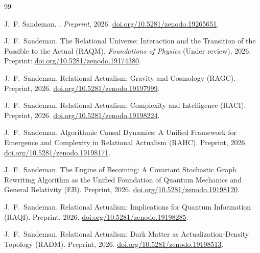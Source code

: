 \documentclass[11pt,a4paper]{article}
\theoremstyle{plain}
\theoremstyle{definition}
\theoremstyle{remark}
\begin{document}

\begin{thebibliography}{99}

J.~F. Sandeman.
.
\newblock \textit{Preprint}, 2026.
\newblock \href{https://doi.org/10.5281/zenodo.19265651}{doi.org/10.5281/zenodo.19265651}.


J.~F.~Sandeman.
\newblock The Relational Universe: Interaction and the Transition of the
  Possible to the Actual ({RAQM}).
\newblock \textit{Foundations of Physics} (Under review), 2026.
\newblock Preprint: \href{https://doi.org/10.5281/zenodo.19174380}{doi.org/10.5281/zenodo.19174380}.

J.~F.~Sandeman.
\newblock Relational Actualism: Gravity and Cosmology ({RAGC}).
\newblock Preprint, 2026.
\newblock \href{https://doi.org/10.5281/zenodo.19197999}{doi.org/10.5281/zenodo.19197999}.

J.~F.~Sandeman.
\newblock Relational Actualism: Complexity and Intelligence ({RACI}).
\newblock Preprint, 2026.
\newblock \href{https://doi.org/10.5281/zenodo.19198224}{doi.org/10.5281/zenodo.19198224}.

J.~F.~Sandeman.
\newblock Algorithmic Causal Dynamics: A Unified Framework for Emergence and
  Complexity in Relational Actualism ({RAHC}).
\newblock Preprint, 2026.
\newblock \href{https://doi.org/10.5281/zenodo.19198171}{doi.org/10.5281/zenodo.19198171}.

J.~F.~Sandeman.
\newblock The Engine of Becoming: A Covariant Stochastic Graph Rewriting
  Algorithm as the Unified Foundation of Quantum Mechanics and General
  Relativity ({EB}).
\newblock Preprint, 2026.
\newblock \href{https://doi.org/10.5281/zenodo.19198120}{doi.org/10.5281/zenodo.19198120}.

J.~F.~Sandeman.
\newblock Relational Actualism: Implications for Quantum Information ({RAQI}).
\newblock Preprint, 2026.
\newblock \href{https://doi.org/10.5281/zenodo.19198285}{doi.org/10.5281/zenodo.19198285}.

J.~F.~Sandeman.
\newblock Relational Actualism: Dark Matter as Actualization-Density Topology
  ({RADM}).
\newblock Preprint, 2026.
\newblock \href{https://doi.org/10.5281/zenodo.19198513}{doi.org/10.5281/zenodo.19198513}.


\end{thebibliography}
\end{document}
